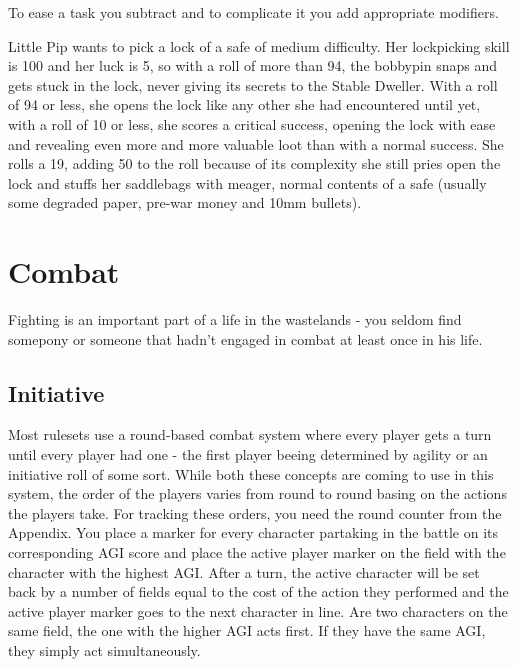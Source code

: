 To ease a task you subtract and to complicate it you add appropriate modifiers.
\begin{Example}
Little Pip wants to pick a lock of a safe of medium difficulty. Her lockpicking skill is 100 and her luck is 5, so with a roll of more than 94, the bobbypin snaps and gets stuck in the lock, never giving its secrets to the Stable Dweller. With a roll of 94 or less, she opens the lock like any other she had encountered until yet, with a roll of 10 or less, she scores a critical success, opening the lock with ease and revealing even more and more valuable loot than with a normal success. She rolls a 19, adding 50 to the roll because of its complexity she still pries open the lock and stuffs her saddlebags with meager, normal contents of a safe (usually some degraded paper, pre-war money and 10mm bullets).
\end{Example}

\section{Combat}
Fighting is an important part of a life in the wastelands - you seldom find somepony or someone that hadn't engaged in combat at least once in his life.
\subsection{Initiative}
Most rulesets use a round-based combat system where every player gets a turn until every player had one - the first player beeing determined by agility or an initiative roll of some sort. While both these concepts are coming to use in this system, the order of the players varies from round to round basing on the actions the players take. For tracking these orders, you need the round counter from the Appendix. You place a marker for every character partaking in the battle on its corresponding AGI score and place the active player marker on the field with the character with the highest AGI. After a turn, the active character will be set back by a number of fields equal to the cost of the action they performed and the active player marker goes to the next character in line. Are two characters on the same field, the one with the higher AGI acts first. If they have the same AGI, they simply act simultaneously. 
